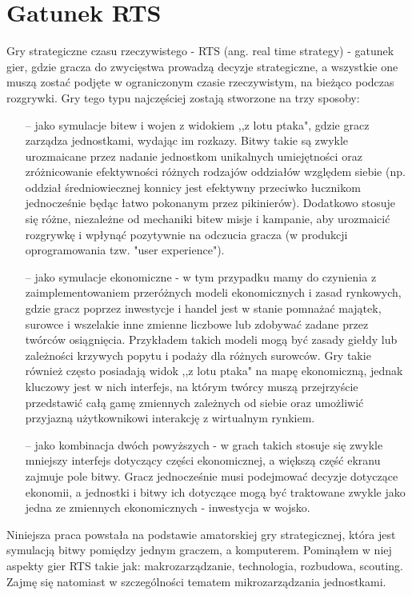 \documentclass[12pt]{report}
\begin{document}
\section {Gatunek RTS}
Gry strategiczne czasu rzeczywistego - RTS (ang. real time strategy) - gatunek gier, gdzie gracza do zwycięstwa prowadzą decyzje strategiczne, a wszystkie one muszą zostać podjęte w ograniczonym czasie rzeczywistym, na bieżąco podczas rozgrywki. Gry tego typu najczęściej zostają stworzone na trzy sposoby: 
\begin{itemize}
\item[--] jako symulacje bitew i wojen z widokiem ,,z lotu ptaka", gdzie gracz zarządza jednostkami, wydając im rozkazy. Bitwy takie są zwykle urozmaicane przez nadanie jednostkom unikalnych umiejętności oraz zróżnicowanie efektywności różnych rodzajów oddziałów względem siebie (np. oddział średniowiecznej konnicy jest efektywny przeciwko łucznikom jednocześnie będąc łatwo pokonanym przez pikinierów). Dodatkowo stosuje się różne, niezależne od mechaniki bitew misje i kampanie, aby urozmaicić rozgrywkę i wpłynąć pozytywnie na odczucia gracza (w produkcji oprogramowania tzw. "user experience").
\item[--] jako symulacje ekonomiczne - w tym przypadku mamy do czynienia z zaimplementowaniem przeróżnych modeli ekonomicznych i zasad rynkowych, gdzie gracz poprzez inwestycje i handel jest w stanie pomnażać majątek, surowce i wszelakie inne zmienne liczbowe lub zdobywać zadane przez twórców osiągnięcia. Przykładem takich modeli mogą być zasady giełdy lub zależności krzywych popytu i podaży dla różnych surowców. Gry takie również często posiadają widok ,,z lotu ptaka" na mapę ekonomiczną, jednak kluczowy jest w nich interfejs, na którym twórcy muszą przejrzyście przedstawić całą gamę zmiennych zależnych od siebie oraz umożliwić przyjazną użytkownikowi interakcję z wirtualnym rynkiem.
\item[--] jako kombinacja dwóch powyższych - w grach takich stosuje się zwykle mniejszy interfejs dotyczący części ekonomicznej, a większą część ekranu zajmuje pole bitwy. Gracz jednocześnie musi podejmować decyzje dotyczące ekonomii, a jednostki i bitwy ich dotyczące mogą być traktowane zwykle jako jedna ze zmiennych ekonomicznych - inwestycja w wojsko.
\end{itemize} 
Niniejsza praca powstała na podstawie amatorskiej gry strategicznej, która jest symulacją bitwy pomiędzy jednym graczem, a komputerem. Pominąłem w niej aspekty gier RTS takie jak: makrozarządzanie, technologia, rozbudowa, scouting. Zajmę się natomiast w szczególności tematem mikrozarządzania jednostkami. 
\end{document}

